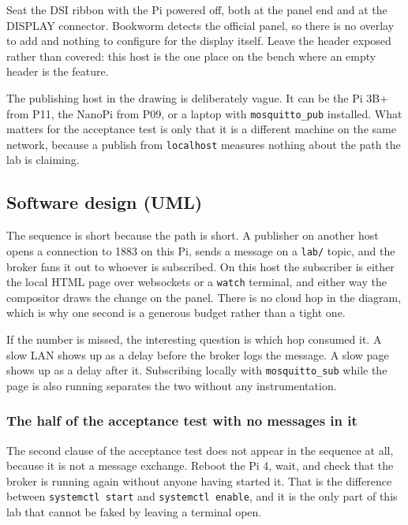 Seat the DSI ribbon with the Pi powered off, both at the panel end and at the DISPLAY connector. Bookworm detects the official panel, so there is no overlay to add and nothing to configure for the display itself. Leave the header exposed rather than covered: this host is the one place on the bench where an empty header is the feature.

The publishing host in the drawing is deliberately vague. It can be the Pi 3B+ from P11, the NanoPi from P09, or a laptop with \texttt{mosquitto\_pub} installed. What matters for the acceptance test is only that it is a different machine on the same network, because a publish from \texttt{localhost} measures nothing about the path the lab is claiming.

\subsection*{Software design (UML)}


The sequence is short because the path is short. A publisher on another host opens a connection to 1883 on this Pi, sends a message on a \texttt{lab/} topic, and the broker fans it out to whoever is subscribed. On this host the subscriber is either the local HTML page over websockets or a \texttt{watch} terminal, and either way the compositor draws the change on the panel. There is no cloud hop in the diagram, which is why one second is a generous budget rather than a tight one.

If the number is missed, the interesting question is which hop consumed it. A slow LAN shows up as a delay before the broker logs the message. A slow page shows up as a delay after it. Subscribing locally with \texttt{mosquitto\_sub} while the page is also running separates the two without any instrumentation.

\subsubsection*{The half of the acceptance test with no messages in it}

The second clause of the acceptance test does not appear in the sequence at all, because it is not a message exchange. Reboot the Pi 4, wait, and check that the broker is running again without anyone having started it. That is the difference between \texttt{systemctl start} and \texttt{systemctl enable}, and it is the only part of this lab that cannot be faked by leaving a terminal open.

